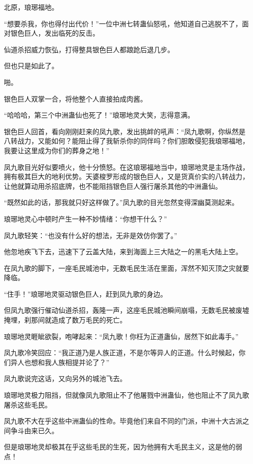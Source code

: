 
\begin{this_body}

北原，琅琊福地。

“想要杀我，你也得付出代价！”一位中洲七转蛊仙怒吼，他知道自己逃脱不了，面对银色巨人，发出临死的反击。

仙道杀招威力恢弘，打得整具银色巨人都踉跄后退几步。

但也只是如此了。

啪。

银色巨人双掌一合，将他整个人直接拍成肉酱。

“哈哈哈，第三个中洲蛊仙也死了！”琅琊地灵大笑，志得意满。

银色巨人回首，看向刚刚赶来的凤九歌，发出挑衅的吼声：“凤九歌啊，你纵然是八转战力，又能如何？能阻止得了我斩杀你的同伴吗？你们胆敢侵犯我琅琊福地，我要让这里成为你们的葬身之地！”

凤九歌目光好似要喷火，他十分愤怒。在这琅琊福地当中，琅琊地灵是主场作战，拥有极其巨大的地利优势。天婆梭罗形成的银色巨人，又是货真价实的八转战力，让他就算动用杀招底牌，也不能阻挡银色巨人强行屠杀其他的中洲蛊仙。

“既然如此的话，那我就只好这样做了。”凤九歌的目光忽然变得深幽莫测起来。

琅琊地灵心中顿时产生一种不妙情绪：“你想干什么？”

凤九歌轻笑：“也没有什么好的想法，无非是效仿你罢了。”

他忽地疾飞下去，迅速下了云盖大陆，来到海面上三大陆之一的黑毛大陆上空。

在凤九歌的脚下，一座毛民城池中，无数毛民生活在里面，浑然不知灭顶之灾就要降临。

“住手！”琅琊地灵驱动银色巨人，赶到凤九歌的身边。

但凤九歌强行催动仙道杀招，轰隆一声，这座毛民城池瞬间崩塌，无数毛民被废墟掩埋，刹那间就造成了数万毛民的死亡。

琅琊地灵睚眦欲裂，咆哮起来：“凤九歌！你枉为正道蛊仙，居然下如此毒手。”

凤九歌冷笑回应：“我正道乃是人族正道，不是尔等异人的正道。什么时候起，你们异人也想和我人族相提并论了？”

凤九歌说完这话，又向另外的城池飞去。

琅琊地灵极力阻挡，但就像凤九歌阻止不了他屠戮中洲蛊仙，他也阻止不了凤九歌屠杀这些毛民。

凤九歌不大在乎这些中洲蛊仙的性命。毕竟他们来自不同的门派，中洲十大古派之间争斗由来已久。

但是琅琊地灵却极其在乎这些毛民的生死，因为他拥有大毛民主义，这是他的弱点！


\end{this_body}
